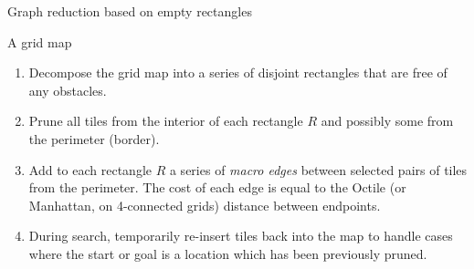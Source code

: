\begin{algorithm}
\caption{Graph reduction based on empty rectangles}
\label{alg:rsr}
\begin{algorithmic}
\REQUIRE A grid map 
\begin{enumerate}
\item{\label{alg:rsr:1} Decompose the grid map into a series of disjoint rectangles that are free of any obstacles.}
\item{\label{alg:rsr:2} Prune all tiles from the interior of each rectangle $R$
and possibly some from the perimeter (border).}
\item{\label{alg:rsr:3} Add to each rectangle $R$ a series of \emph{macro edges} between 
selected pairs of tiles from the perimeter. The cost of each edge is equal to
the Octile (or Manhattan, on 4-connected grids) distance between endpoints.}
\item{\label{alg:rsr:4} During search, temporarily re-insert tiles back into the map to handle cases where the
start or goal is a location which has been previously pruned.}
\end{enumerate}
\end{algorithmic}
\end{algorithm}
